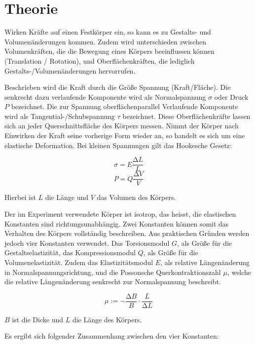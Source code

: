 \section{Theorie}

Wirken Kräfte auf einen Festkörper ein, so kann es zu Gestalts- und Volumenänderungen kommen. 
Zudem wird unterschieden zwischen Volumenkräften, die die Bewegung eines Körpers beeinflussen können (Translation / Rotation), und Oberflächenkräften, die lediglich Gestalts-/Volumenänderungen hervorrufen.

Beschrieben wird die Kraft durch die Größe Spannung (Kraft/Fläche). Die senkrecht dazu verlaufende Komponente wird als Normalspannung $\sigma$ oder Druck $P$ bezeichnet. Die zur Spannung oberflächenparallel Verlaufende Komponente wird als Tangential-/Schubspannung $\tau$ bezeichnet. Diese Oberflächenkräfte lassen sich an jeder Querschnittsfläche des Körpers messen.
Nimmt der Körper nach Einwirken der Kraft seine vorherige Form wieder an, so handelt es sich um eine elastische Deformation.
Bei kleinen Spannungen gilt das Hookesche Gesetz:

\begin{equation}
	\sigma = E\frac{\increment L}{L}
\end{equation}
\begin{equation}
	P = Q\frac{\increment V}{V}
\end{equation}

Hierbei ist $L$ die Länge und $V$ das Volumen des Körpers.

Der im Experiment verwendete Körper ist isotrop, das heisst, die elastischen Konstanten sind richtungsunabhängig.
Zwei Konstanten können somit das Verhalten des Körpers vollständig beschreiben. Aus praktischen Gründen werden jedoch vier Konstanten verwendet. Das Torsionsmodul $G$, als Größe für die Gestaltselastizität, das Kompressionsmodul $Q$, als Größe für die Volumenelastizität. Zudem das Elastizitätsmodul $E$, als relative Längenänderung in Normalspannungsrichtung, und die Possonsche Querkontraktionszahl $\mu$, welche die relative Längenänderung senkrecht zur Normalspannung beschreibt.

\begin{equation}
	\mu:= -\frac{\increment B}{B} \cdot \frac{L}{\increment L}
\end{equation}

$B$ ist die Dicke und $L$ die Länge des Körpers.

Es ergibt sich folgender Zusammenhang zwischen den vier Konstanten:

